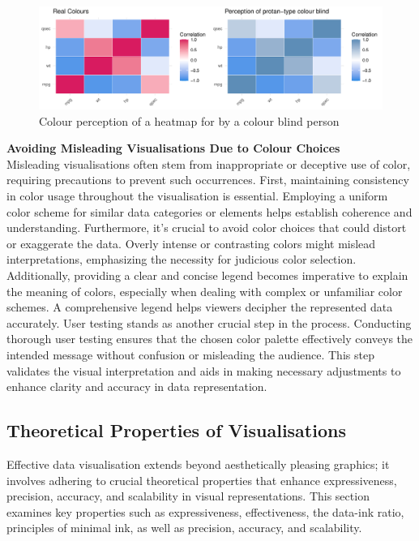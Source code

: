\documentclass{article}\usepackage[]{graphicx}\usepackage[]{xcolor}
\makeatletter
\def\maxwidth{ %
  \ifdim\Gin@nat@width>\linewidth
    \linewidth
  \else
    \Gin@nat@width
  \fi
}
\newenvironment{knitrout}{}{} %
\makeatother
\begin{document}
\begin{knitrout}\scriptsize
{}\color{fgcolor}\begin{figure}[H]

{\centering \includegraphics[width=\maxwidth]{figure/beamer-colour-plot-1} 

}

\caption[Colour perception of a heatmap for by a colour blind person]{Colour perception of a heatmap for by a colour blind person}\label{fig:colour-plot}
\end{figure}

\end{knitrout}

\noindent \textbf{Avoiding Misleading Visualisations Due to Colour Choices}\\
Misleading visualisations often stem from inappropriate or deceptive use of color, requiring precautions to prevent such occurrences. First, maintaining consistency in color usage throughout the visualisation is essential. Employing a uniform color scheme for similar data categories or elements helps establish coherence and understanding. Furthermore, it's crucial to avoid color choices that could distort or exaggerate the data. Overly intense or contrasting colors might mislead interpretations, emphasizing the necessity for judicious color selection.\\
Additionally, providing a clear and concise legend becomes imperative to explain the meaning of colors, especially when dealing with complex or unfamiliar color schemes. A comprehensive legend helps viewers decipher the represented data accurately. User testing stands as another crucial step in the process. Conducting thorough user testing ensures that the chosen color palette effectively conveys the intended message without confusion or misleading the audience. This step validates the visual interpretation and aids in making necessary adjustments to enhance clarity and accuracy in data representation.\\

\subsection{Theoretical Properties of Visualisations}
Effective data visualisation extends beyond aesthetically pleasing graphics; it involves adhering to crucial theoretical properties that enhance expressiveness, precision, accuracy, and scalability in visual representations. This section examines key properties such as expressiveness, effectiveness, the data-ink ratio, principles of minimal ink, as well as precision, accuracy, and scalability.\\
\end{document}
